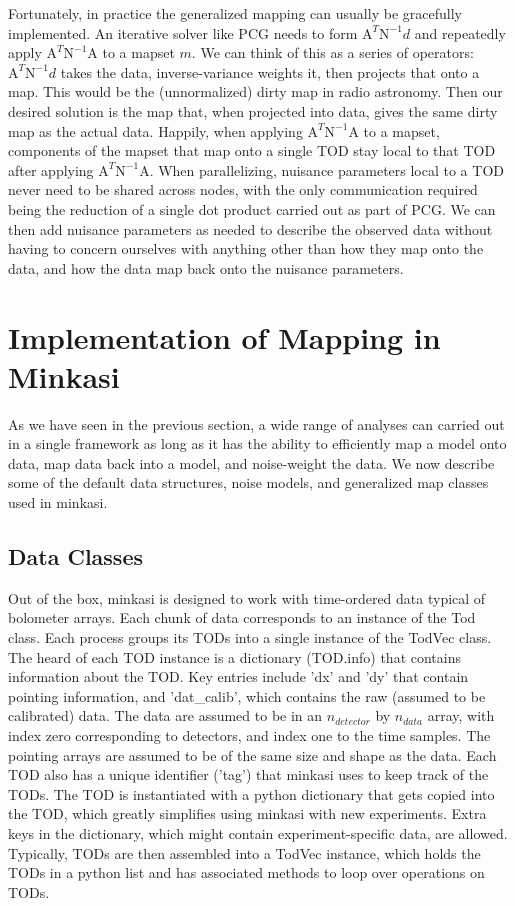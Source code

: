 \documentclass[12]{article}
\begin{document}
Fortunately, in practice the generalized mapping can usually be
gracefully implemented.  An iterative solver like PCG needs to form
$\mathrm{A}^T \mathrm{N}^{-1} d$ and repeatedly apply $\mathrm{A}^T
\mathrm{N}^{-1} \mathrm{A}$ to a mapset $m$.  We can think of this as
a series of operators: $\mathrm{A}^T \mathrm{N}^{-1}d$ takes the data,
inverse-variance weights it, then projects that onto a map.  This
would be the (unnormalized) dirty map in radio astronomy.  Then our
desired solution is the map that, when projected into data, gives the
same dirty map as the actual data.  Happily, when applying
$\mathrm{A}^T \mathrm{N}^{-1} \mathrm{A}$ to a mapset, components of
the mapset that map onto a single TOD stay local to that TOD after
applying $\mathrm{A}^T \mathrm{N}^{-1}\mathrm{A}$.  When
parallelizing, nuisance parameters local to a TOD never need to be
shared across nodes, with the only communication required being the
reduction of a single dot product carried out as part of PCG.  We can
then add nuisance parameters as needed to describe the observed data
without having to concern ourselves with anything other than how they
map onto the data, and how the data map back onto the nuisance parameters.

\section{Implementation of Mapping in Minkasi}

As we have seen in the previous section, a wide range of analyses can
carried out in a single framework as long as it has the ability to
efficiently map a model onto data, map data back into a model, and
noise-weight the data.  We now describe some of the default data
structures, noise models, and generalized map classes used in
minkasi.  

\subsection{Data Classes}

Out of the box, minkasi is designed to work with time-ordered data
typical of bolometer arrays.  Each chunk of data corresponds to an
instance of the Tod class.  Each process groups its TODs into a single
instance of the TodVec class.  The heard of each TOD instance is a
dictionary (TOD.info) that contains information about the TOD.  Key
entries include 'dx' and 'dy' that contain pointing information, and
'dat\_calib', which contains the raw (assumed to be calibrated) data.
The data are assumed to be in an $n_{detector}$ by $n_{data}$ array,
with index zero corresponding to detectors, and index one to the time
samples.  The pointing arrays are assumed to be of the same size and
shape as the data.  Each TOD also has a unique identifier ('tag') that
minkasi uses to keep track of the TODs.  The TOD is instantiated with
a python dictionary that gets copied into the TOD, which greatly
simplifies using minkasi with new experiments.  Extra keys in the
dictionary, which might contain experiment-specific data, are
allowed.  Typically, TODs are then assembled into a TodVec instance,
which holds the TODs in a python list and has associated methods to
loop over operations on TODs.  
\end{document}
